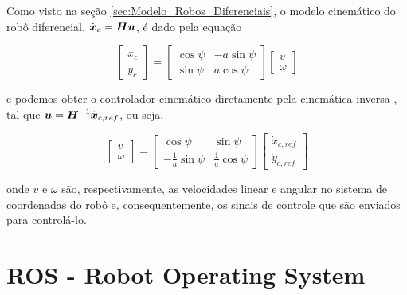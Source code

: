         Como visto na seção \ref{sec:Modelo_Robos_Diferenciais}, o modelo cinemático do robô diferencial, \( \dot{\boldsymbol{x}}_c = \boldsymbol{H} \boldsymbol{u} \), é dado pela equação
        
        \begin{equation}
            \begin{bmatrix} \dot{x}_c \\ \dot{y}_c  \end{bmatrix} = \begin{bmatrix} \cos{\psi} & -a \sin{\psi} \\ \sin{\psi} & a \cos{\psi}   \end{bmatrix} \begin{bmatrix} v \\ \omega    \end{bmatrix}
            \label{eq:kinematics_differential_limo}
        \end{equation}
        
        e podemos obter o controlador cinemático diretamente pela cinemática inversa \cite{Sarcinelli-Filho2023_4}, tal que $\boldsymbol{u} = \boldsymbol{H}^{-1} \dot{\boldsymbol{x}}_{c,ref}$, ou seja,
        
        \begin{equation}
           \begin{bmatrix} v \\ \omega    \end{bmatrix}
           =  
           \begin{bmatrix} \cos{\psi} & \sin{\psi} \\ -\frac{1}{a}\sin{\psi} & \frac{1}{a} \cos{\psi}   \end{bmatrix} 
           \begin{bmatrix}\dot{x}_{c,ref} \\ \dot{y}_{c,ref}   \end{bmatrix}
           \label{eq:kinematic_controller_differential_limo}
        \end{equation}
        
        onde $v$ e $\omega$ são, respectivamente, as velocidades linear e angular no sistema de coordenadas do robô e, consequentemente, os sinais de controle que são enviados para controlá-lo.
    


\section{ROS - Robot Operating System}
\label{sec:ROS}


